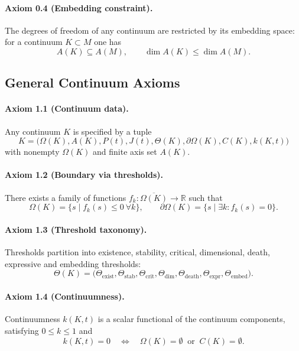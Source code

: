 \paragraph{Axiom 0.4 (Embedding constraint).}
The degrees of freedom of any continuum are restricted by its embedding space:
for a continuum \(K\subset M\) one has
\[
  A(K) \subseteq A(M),
  \qquad
  \dim A(K) \le \dim A(M).
\]

\subsection{General Continuum Axioms}

\paragraph{Axiom 1.1 (Continuum data).}
Any continuum \(K\) is specified by a tuple
\[
  K =
  \big(
    \Omega(K), A(K), P(t), J(t),
    \Theta(K), \partial\Omega(K), C(K), k(K,t)
  \big)
\]
with nonempty \(\Omega(K)\) and finite axis set \(A(K)\).

\paragraph{Axiom 1.2 (Boundary via thresholds).}
There exists a family of functions
\(f_k : \overline{\Omega(K)}\to\mathbb{R}\) such that
\[
  \Omega(K) = \big\{ s \mid f_k(s)\le 0 \ \forall k \big\},
  \qquad
  \partial\Omega(K) = \big\{ s \mid \exists k: f_k(s)=0 \big\}.
\]

\paragraph{Axiom 1.3 (Threshold taxonomy).}
Thresholds partition into existence, stability, critical, dimensional, death,
expressive and embedding thresholds:
\[
  \Theta(K) =
  \big(
    \Theta_{\mathrm{exist}},
    \Theta_{\mathrm{stab}},
    \Theta_{\mathrm{crit}},
    \Theta_{\mathrm{dim}},
    \Theta_{\mathrm{death}},
    \Theta_{\mathrm{expr}},
    \Theta_{\mathrm{embed}}
  \big).
\]

\paragraph{Axiom 1.4 (Continuumness).}
Continuumness \(k(K,t)\) is a scalar functional of the continuum components,
satisfying \(0\le k\le 1\) and
\[
  k(K,t) = 0 \quad\Longleftrightarrow\quad
  \Omega(K) = \emptyset
  \ \text{ or }\
  C(K)=\emptyset.
\]

